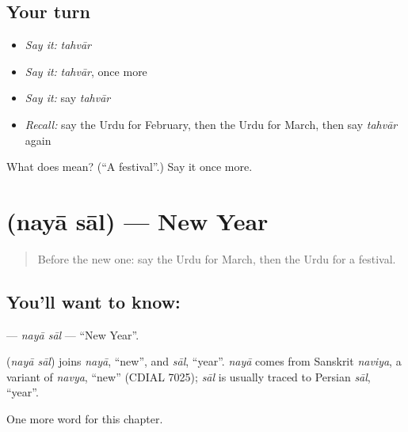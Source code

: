 \subsection*{Your turn}
\begin{itemize}
\raggedright
  \item \emph{Say it:} \emph{tahvār}
  \item \emph{Say it:} \emph{tahvār}, once more
  \item \emph{Say it:} say \emph{tahvār}
  \item \emph{Recall:} say the Urdu for February, then the Urdu for March, then say \emph{tahvār} again
\end{itemize}

\begin{tcolorbox}[breakable,colback=teal!4,colframe=teal!35!black,title={Before you move on}]
What does  mean? (\textquotedblleft{}A festival\textquotedblright{}.) Say it once more.
\end{tcolorbox}
\section[\texorpdfstring{\ur{نیا} \ur{سال} (nayā sāl)}{نیا سال (nayā sāl)}]{  (nayā sāl) — New Year}

\label{lesson:UR-C156-naya-sal}



\begin{quote}
Before the new one: say the Urdu for March, then the Urdu for a festival.
\end{quote}

\subsection*{You'll want to know:  }
\textbf{ } — \emph{nayā sāl} — \textquotedblleft{}New Year\textquotedblright{}.

\begin{cousinweb}
\textbf{ } (\emph{nayā sāl}) joins \emph{nayā}, \textquotedblleft{}new\textquotedblright{}, and \emph{sāl}, \textquotedblleft{}year\textquotedblright{}. \emph{nayā} comes from Sanskrit \emph{naviya}, a variant of \emph{navya}, \textquotedblleft{}new\textquotedblright{} (CDIAL 7025); \emph{sāl} is usually traced to Persian \emph{sāl}, \textquotedblleft{}year\textquotedblright{}.
\end{cousinweb}

\begin{grammarlens}[title={What you've built}]
One more word for this chapter.
\end{grammarlens}

